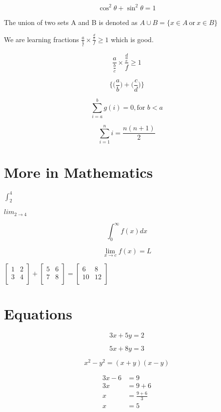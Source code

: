 \documentclass{article}
\begin{document}
    \[ \cos^2 \theta + \sin^2 \theta = 1\]
    
    The union of two sets A and B is denoted as 
    $ A \cup B = \{ x \in A \ \text{or} \ x \in B \} $
    
    We are learning fractions $ \frac{a}{\frac{b}{c}} \times \frac{\frac{d}{e}}{f} \geq 1$ which is good.

    \[ \frac{a}{\frac{b}{c}} \times \frac{\frac{d}{e}}{f} \geq 1\]

    \[ \Bigg\{ \bigg(\frac{a}{b}\bigg) + \bigg(\frac{c}{d}\bigg)\Bigg\} \]

    \[ \sum_{i=a}^{b} g(i) = 0, \text{for } b < a \]

    \[ \sum_{i=1}^{n} i = \frac{n(n+1)}{2} \]

    \section{More in Mathematics}

    $\int_{2}^{4}$

    $lim_{2 \to 4}$

    \[ \int_{0}^{\infty} f(x)dx \]

    \[ \lim_{x \to c} f(x)=L \]

    $
    \begin{bmatrix}
        1 & 2 \\
        3 & 4 \\
    \end{bmatrix}
    +
    \begin{bmatrix}
        5 & 6 \\
        7 & 8 \\
    \end{bmatrix}
    =
    \begin{bmatrix}
        6 & 8 \\
        10 & 12 \\
    \end{bmatrix}
    $

    \section{Equations}
    \begin{equation}
        3x + 5y = 2
    \end{equation}
    
    \begin{equation}
        5x + 8y = 3
    \end{equation}

    \begin{equation}
        x^{2} - y^{2} = (x+y)(x-y)
    \end{equation}

    \begin{align}
        3x - 6 &= 9 \\
        3x &= 9 + 6 \nonumber \\
        x &= \frac{9+6}{3} \nonumber \\
        x &= 5 \nonumber
    \end{align}
\end{document}
